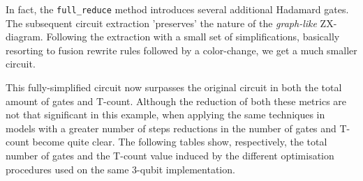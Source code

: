 
In fact, the \texttt{full\_reduce} method introduces several additional Hadamard gates. %
The subsequent  circuit extraction  'preserves' the nature of the \textit{graph-like} ZX-diagram. 
Following the extraction with a small set of simplifications, basically resorting to fusion rewrite rules followed by a color-change, we get a much smaller circuit. 

This fully-simplified circuit now surpasses the original circuit in both the total amount of gates and T-count.%
Although the reduction of both these metrics are not that significant in this example, when applying the same techniques in models with a greater number of steps  reductions in the number of gates and T-count become quite clear. The following tables show, respectively, the total number of  gates and the T-count value induced by the different optimisation procedures used on the same 3-qubit implementation.

